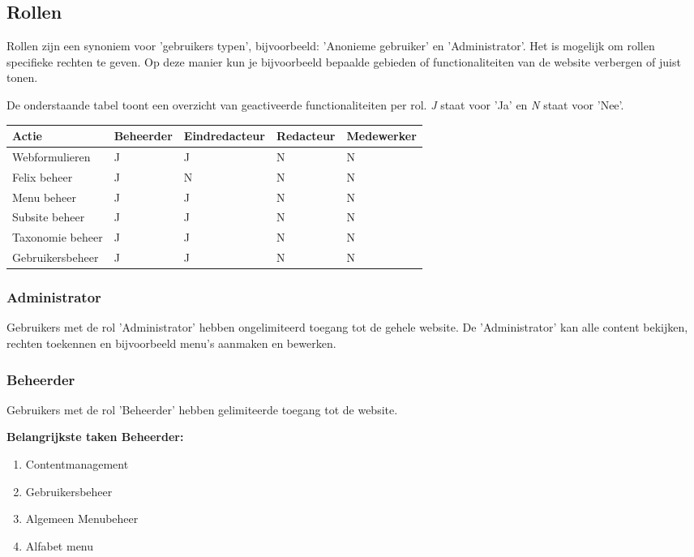 \subsection{Rollen}\label{rollen}

Rollen zijn een synoniem voor 'gebruikers typen', bijvoorbeeld: 'Anonieme gebruiker' en 'Administrator'.  Het is mogelijk om rollen specifieke rechten te geven. Op deze manier kun je bijvoorbeeld bepaalde gebieden of functionaliteiten van de website verbergen of juist tonen. 

De onderstaande tabel toont een overzicht van geactiveerde functionaliteiten per rol.
\emph{J} staat voor 'Ja' en \emph{N} staat voor 'Nee'. 

\begin{tabularx}{\textwidth}{ | p{5cm} |X|X|X|X| }
  \hline
  Actie & Beheerder & Eindredacteur & Redacteur & Medewerker \\ \hline
  Webformulieren  & J  & J  & N & N  \\ \hline
  Felix beheer  & J  & N  & N & N  \\ \hline
  Menu beheer  & J  & J  & N & N  \\ \hline
  Subsite beheer  & J  & J  & N & N  \\ \hline
  Taxonomie beheer  & J  & J  & N & N  \\ \hline
  Gebruikersbeheer  & J  & J  & N & N  \\ \hline
\end{tabularx}


\subsubsection{Administrator}\label{administrator}
Gebruikers met de rol 'Administrator' hebben ongelimiteerd toegang tot de gehele website. De 'Administrator' kan alle content bekijken, rechten toekennen en bijvoorbeeld menu's aanmaken en bewerken.

\subsubsection{Beheerder}\label{beheerder}
Gebruikers met de rol 'Beheerder' hebben gelimiteerde toegang tot de website. 

\textbf{Belangrijkste taken Beheerder:}

\begin{enumerate}
\item Contentmanagement
\item Gebruikersbeheer
\item Algemeen Menubeheer
\item Alfabet menu
\end{enumerate}

